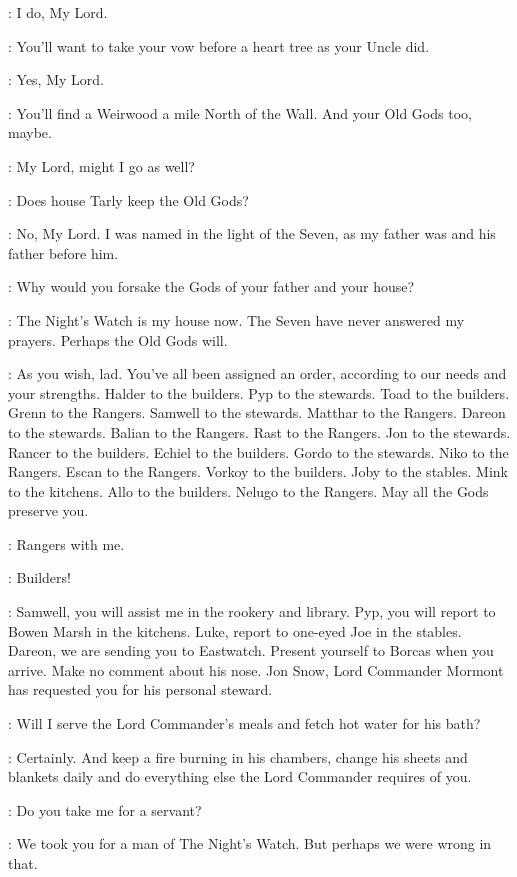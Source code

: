 \JON: I do, My Lord. 

\JEOR: You'll want to take your vow before a heart tree as your Uncle did. 

\JON: Yes, My Lord. 

\JEOR: You'll find a Weirwood a mile North of the Wall. And your Old Gods too, maybe. 

\SAM: My Lord, might I go as well? 

\JEOR: Does house Tarly keep the  Old Gods? 

\SAM: No, My Lord. I was named in the light of the Seven, as my father was and his father before him. 

\JEOR: Why would you forsake the Gods of your father and your house? 

\SAM: The Night's Watch is my house now. The Seven have never answered my prayers. Perhaps the  Old Gods will. 

\JEOR: As you wish, lad. You've all been assigned an order, according to our needs and your strengths. Halder to the builders. Pyp to the stewards. Toad to the builders. Grenn to the Rangers. Samwell to the stewards. Matthar to the Rangers. Dareon to the stewards. Balian to the Rangers. Rast to the Rangers. Jon to the stewards.  Rancer to the builders. Echiel to the builders. Gordo to the stewards. Niko to the Rangers. Escan to the Rangers. Vorkoy to the builders. Joby to the stables. Mink to the kitchens. Allo to the builders. Nelugo to the Rangers. May all the Gods preserve you. 

\WATCHMANa: Rangers with me. 

\WATCHMANb: Builders! 

\AEMON: Samwell, you will assist me in the rookery and library. Pyp, you will report to Bowen Marsh in the kitchens. Luke, report to one-eyed Joe in the stables. Dareon, we are sending you to Eastwatch. Present yourself to Borcas when you arrive. Make no comment about his nose. Jon Snow, Lord Commander Mormont has requested you for his personal steward. 

\JON:  Will I serve the Lord Commander's meals and fetch hot water for his bath?

\AEMON: Certainly. And keep a fire burning in his chambers, change his sheets and blankets daily and do everything else the Lord Commander requires of you. 

\JON:  Do you take me for a servant? 

\AEMON: We took you for a man of The Night's Watch. But perhaps we were wrong in that. 

